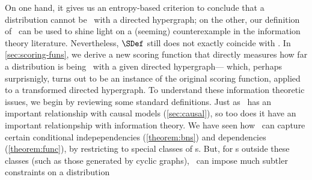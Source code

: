 {{    On one hand, it gives us an entropy-based criterion to conclude that a distribution cannot be \scible\ with a directed hypergraph; on the other, our definition of \scibility\ can be used to shine light on a (seeming) counterexample in the information theory literature.
    Nevertheless, $\SDef$ still does not exactly coincide with \scibility.
        In \cref{sec:scoring-funs}, we derive a new scoring function that
        directly measures how far a distribution is being \scible\ with a 
        given directed hypergraph---%
        which, perhaps surprisnigly, turns out to be an instance of the original scoring function, applied to a transformed directed hypergraph.
    To understand these information theoretic issues, we begin by reviewing some standard definitions.
}
Just as \scibility\ has 
an important relationship with causal models
 (\cref{sec:causal}), so too does it have 
an important relationpship with information theory.
%
We have seen how \scibility\ can capture 
certain conditional indepependencies (\cref{theorem:bns})
and dependencies (\cref{theorem:func}),
by restricting to special classes of \hgraph s. 
But, for \hgraph s outside these classes (such as those generated by cyclic graphs), \scibility\ can 
impose much subtler constraints on a
    distribution
}
